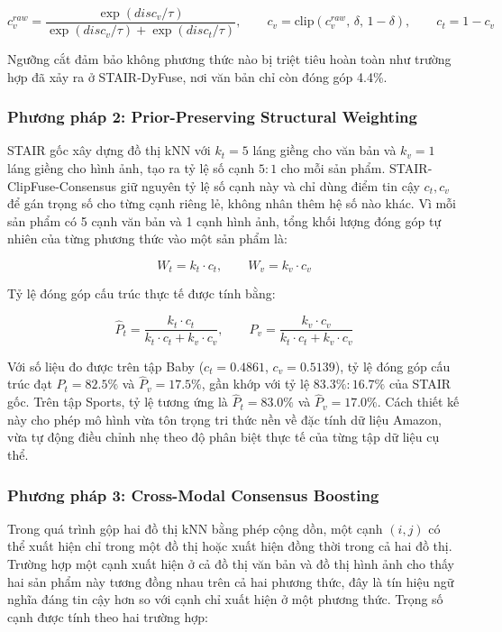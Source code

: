\begin{longtable}
\begin{equation}
c_v^{raw} = \frac{\exp(disc_v / \tau)}{\exp(disc_v / \tau) + \exp(disc_t / \tau)}, \qquad c_v = \text{clip}(c_v^{raw},\, \delta,\, 1-\delta), \qquad c_t = 1 - c_v
\end{equation}
 
Ngưỡng cắt đảm bảo không phương thức nào bị triệt tiêu hoàn toàn như trường hợp đã xảy ra ở STAIR-DyFuse, nơi văn bản chỉ còn đóng góp 4.4\%.
 
\subsubsection{Phương pháp 2: Prior-Preserving Structural Weighting}
 
STAIR gốc xây dựng đồ thị kNN với $k_t = 5$ láng giềng cho văn bản và $k_v = 1$ láng giềng cho hình ảnh, tạo ra tỷ lệ số cạnh $5{:}1$ cho mỗi sản phẩm. STAIR-ClipFuse-Consensus giữ nguyên tỷ lệ số cạnh này và chỉ dùng điểm tin cậy $c_t, c_v$ để gán trọng số cho từng cạnh riêng lẻ, không nhân thêm hệ số nào khác. Vì mỗi sản phẩm có 5 cạnh văn bản và 1 cạnh hình ảnh, tổng khối lượng đóng góp tự nhiên của từng phương thức vào một sản phẩm là:
 
\begin{equation}
W_t = k_t \cdot c_t, \qquad W_v = k_v \cdot c_v
\end{equation}
 
Tỷ lệ đóng góp cấu trúc thực tế được tính bằng:
 
\begin{equation}
\hat{P}_t = \frac{k_t \cdot c_t}{k_t \cdot c_t + k_v \cdot c_v}, \qquad \hat{P}_v = \frac{k_v \cdot c_v}{k_t \cdot c_t + k_v \cdot c_v}
\end{equation}
 
Với số liệu đo được trên tập Baby ($c_t = 0.4861$, $c_v = 0.5139$), tỷ lệ đóng góp cấu trúc đạt $\hat{P}_t = 82.5\%$ và $\hat{P}_v = 17.5\%$, gần khớp với tỷ lệ $83.3\% : 16.7\%$ của STAIR gốc. Trên tập Sports, tỷ lệ tương ứng là $\hat{P}_t = 83.0\%$ và $\hat{P}_v = 17.0\%$. Cách thiết kế này cho phép mô hình vừa tôn trọng tri thức nền về đặc tính dữ liệu Amazon, vừa tự động điều chỉnh nhẹ theo độ phân biệt thực tế của từng tập dữ liệu cụ thể.
 
\subsubsection{Phương pháp 3: Cross-Modal Consensus Boosting}
 
Trong quá trình gộp hai đồ thị kNN bằng phép cộng dồn, một cạnh $(i,j)$ có thể xuất hiện chỉ trong một đồ thị hoặc xuất hiện đồng thời trong cả hai đồ thị. Trường hợp một cạnh xuất hiện ở cả đồ thị văn bản và đồ thị hình ảnh cho thấy hai sản phẩm này tương đồng nhau trên cả hai phương thức, đây là tín hiệu ngữ nghĩa đáng tin cậy hơn so với cạnh chỉ xuất hiện ở một phương thức. Trọng số cạnh được tính theo hai trường hợp:
 

\end{longtable}
